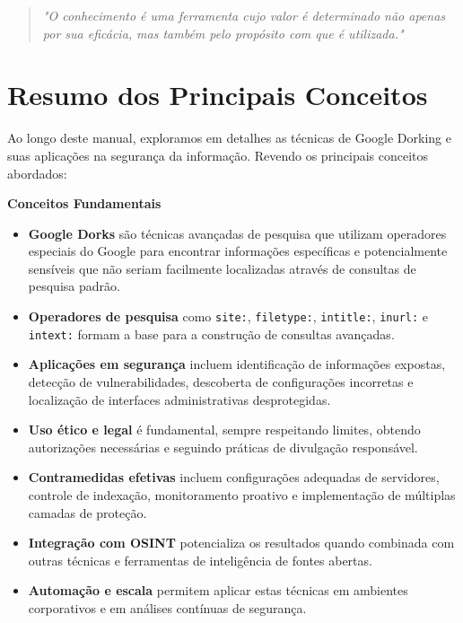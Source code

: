 \documentclass[12pt,a4paper]{book}
\begin{document}
\begin{quote}
\textit{"O conhecimento é uma ferramenta cujo valor é determinado não apenas por sua eficácia, mas também pelo propósito com que é utilizada."} \\
\end{quote}

\section{Resumo dos Principais Conceitos}

Ao longo deste manual, exploramos em detalhes as técnicas de Google Dorking e suas aplicações na segurança da informação. Revendo os principais conceitos abordados:

\begin{mdframed}[backgroundcolor=azulseguranca!10, roundcorner=10pt, leftmargin=1cm, rightmargin=1cm]
\begin{center}
\textbf{\large Conceitos Fundamentais}
\end{center}

\begin{itemize}
    \item \textbf{Google Dorks} são técnicas avançadas de pesquisa que utilizam operadores especiais do Google para encontrar informações específicas e potencialmente sensíveis que não seriam facilmente localizadas através de consultas de pesquisa padrão.
    
    \item \textbf{Operadores de pesquisa} como \texttt{site:}, \texttt{filetype:}, \texttt{intitle:}, \texttt{inurl:} e \texttt{intext:} formam a base para a construção de consultas avançadas.
    
    \item \textbf{Aplicações em segurança} incluem identificação de informações expostas, detecção de vulnerabilidades, descoberta de configurações incorretas e localização de interfaces administrativas desprotegidas.
    
    \item \textbf{Uso ético e legal} é fundamental, sempre respeitando limites, obtendo autorizações necessárias e seguindo práticas de divulgação responsável.
    
    \item \textbf{Contramedidas efetivas} incluem configurações adequadas de servidores, controle de indexação, monitoramento proativo e implementação de múltiplas camadas de proteção.
    
    \item \textbf{Integração com OSINT} potencializa os resultados quando combinada com outras técnicas e ferramentas de inteligência de fontes abertas.
    
    \item \textbf{Automação e escala} permitem aplicar estas técnicas em ambientes corporativos e em análises contínuas de segurança.
\end{itemize}
\end{mdframed}
\end{document}
